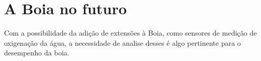 
\section{A Boia no futuro}
Com a possibilidade da adição de extensões à Boia, como sensores de medição de oxigenação da água, a necessidade de analise desses é algo pertinente para o desempenho da boia.






